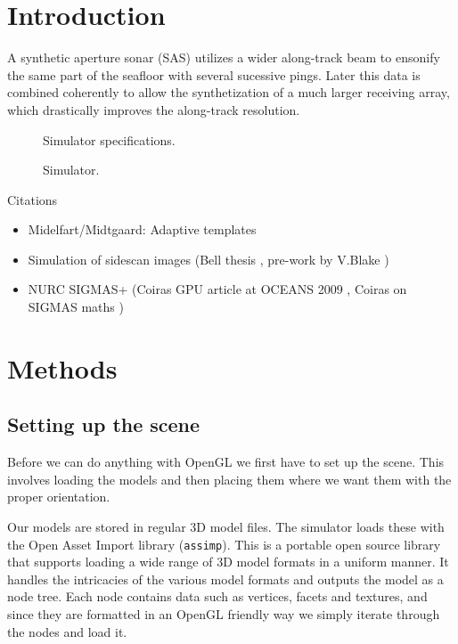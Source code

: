 \documentclass[
   UAM                                          %
 , 12pt                                         %
 , bibtex                                       %
 , layout
]{common/mytemplate}
\begin{document}
\section{Introduction}


A synthetic aperture sonar (SAS) utilizes a wider along-track beam to ensonify the same part of the seafloor with several sucessive pings. Later this data is combined coherently to allow the synthetization of a much larger receiving array, which drastically improves the along-track resolution. 


\begin{figure}[t]\centering%
%
\caption{Simulator specifications.}\label{specs}%
\end{figure}

\begin{figure}[t]\centering%
%
\caption{Simulator.}\label{buildup}%
\end{figure}

Citations
\begin{itemize}
\item Midelfart/Midtgaard: Adaptive templates \cite{Midelfart2010}
\item Simulation of sidescan images (Bell thesis \cite{Bell1997}, pre-work by V.Blake \cite{Blake1993})
\item NURC SIGMAS+ (Coiras GPU article at OCEANS 2009 \cite{Coiras2009a}, Coiras on SIGMAS maths \cite{Coiras2009b})
\end{itemize}


\section{Methods}


\subsection{Setting up the scene}

Before we can do anything with OpenGL we first have to set up the scene. This involves loading the models and then placing them where we want them with the proper orientation. 

Our models are stored in regular 3D model files. The simulator loads these with the Open Asset Import library (\texttt{assimp}). This is a portable open source library that supports loading a wide range of 3D model formats in a uniform manner. It handles the intricacies of the various model formats and outputs the model as a node tree. Each node contains data such as vertices, facets and textures, and since they are formatted in an OpenGL friendly way we simply iterate through the nodes and load it.
\end{document}
